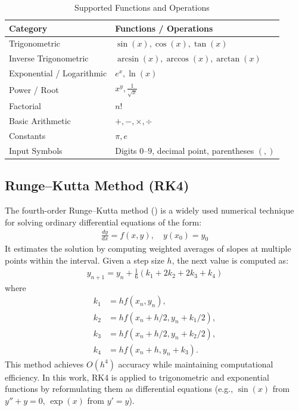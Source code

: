 \documentclass[conference]{IEEEtran}
\begin{document}
\begin{table}[htbp]
\centering
\caption{Supported Functions and Operations}
\label{tab:supported}
\begin{tabular}{ll}
\toprule
\textbf{Category} & \textbf{Functions / Operations} \\
\midrule
Trigonometric & $\sin(x), \cos(x), \tan(x)$ \\
Inverse Trigonometric & $\arcsin(x), \arccos(x), \arctan(x)$ \\
Exponential / Logarithmic & $e^x, \ln(x)$ \\
Power / Root & $x^y, \tfrac{1}{\sqrt{x}}$ \\
Factorial & $n!$ \\
Basic Arithmetic & $+, -, \times, \div$ \\
Constants & $\pi, e$ \\
Input Symbols & Digits $0$–$9$, decimal point, parentheses $(,)$ \\
\bottomrule
\end{tabular}
\end{table}

\subsection{Runge--Kutta Method (RK4)}
The fourth-order Runge--Kutta method (\cite{grewal2014,kreyszig2011}) is a widely used numerical technique for solving ordinary differential equations of the form:
\begin{align}
\frac{dy}{dx} = f(x,y), \quad y(x_0)=y_0
\end{align}
It estimates the solution by computing weighted averages of slopes at multiple points within the interval. Given a step size $h$, the next value is computed as:
\begin{align}
y_{n+1} = y_n + \frac{1}{6}(k_1 + 2k_2 + 2k_3 + k_4)
\end{align}
where
\begin{align}
k_1 &= h f(x_n,y_n), \\
k_2 &= h f(x_n + h/2, y_n + k_1/2), \\
k_3 &= h f(x_n + h/2, y_n + k_2/2), \\
k_4 &= h f(x_n + h, y_n + k_3).
\end{align}
This method achieves $O(h^4)$ accuracy while maintaining computational efficiency. In this work, RK4 is applied to trigonometric and exponential functions by reformulating them as differential equations (e.g., $\sin(x)$ from $y''+y=0$, $\exp(x)$ from $y'=y$).
\end{document}
